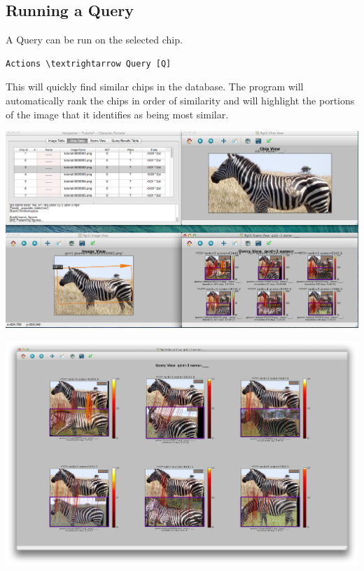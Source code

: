 \documentclass[a4paper,10pt]{article}
\begin{document}
        
        \begin{center}
        \end{center}

    \subsection{Running a Query}
        A Query can be run on the selected chip.

        \begin{Verbatim}[commandchars=\\\{\}]
        Actions \textrightarrow Query [Q]
        \end{Verbatim}
        
\noindent
        This will quickly find similar chips in the database.  The program will
        automatically rank the chips in order of similarity and will highlight
        the portions of the image that it identifies as being most similar.

        \begin{center}
            \includegraphics[scale=0.2]{images/query-all.png}

        \;

            \includegraphics[scale=0.212]{images/query-result.png}
        \end{center}
\end{document}

